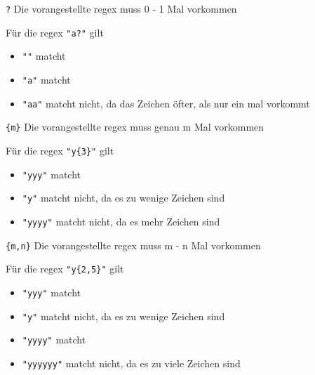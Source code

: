 \documentclass[ignorenonframetext,]{beamer}
\providecommand{\tightlist}{%
  \setlength{\itemsep}{0pt}\setlength{\parskip}{0pt}}
\begin{document}
\begin{frame}

\texttt{?} Die vorangestellte regex muss 0 - 1 Mal vorkommen

Für die regex \texttt{"a?"} gilt

\begin{itemize}
\tightlist
\item
  \texttt{""} matcht
\item
  \texttt{"a"} matcht
\item
  \texttt{"aa"} matcht nicht, da das Zeichen öfter, als nur ein mal
  vorkommt
\end{itemize}

\end{frame}

\begin{frame}

\texttt{\{m\}} Die vorangestellte regex muss genau m Mal vorkommen

Für die regex \texttt{"y\{3\}"} gilt

\begin{itemize}
\tightlist
\item
  \texttt{"yyy"} matcht
\item
  \texttt{"y"} matcht nicht, da es zu wenige Zeichen sind
\item
  \texttt{"yyyy"} matcht nicht, da es mehr Zeichen sind
\end{itemize}

\end{frame}

\begin{frame}

\texttt{\{m,n\}} Die vorangestellte regex muss m - n Mal vorkommen

Für die regex \texttt{"y\{2,5\}"} gilt

\begin{itemize}
\tightlist
\item
  \texttt{"yyy"} matcht
\item
  \texttt{"y"} matcht nicht, da es zu wenige Zeichen sind
\item
  \texttt{"yyyy"} matcht
\item
  \texttt{"yyyyyy"} matcht nicht, da es zu viele Zeichen sind
\end{itemize}

\end{frame}
\end{document}

